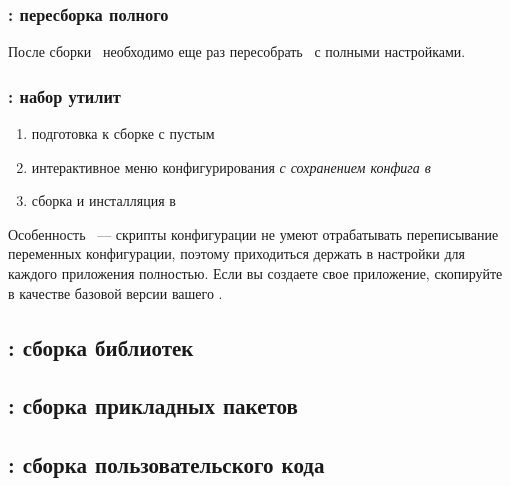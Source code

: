 


\subsubsection{: пересборка полного } \label{azgcc}

После сборки \ необходимо еще раз пересобрать \ с полными
настройками.

\subsubsection{: набор утилит } \label{azbb}


\begin{enumerate}
  \item подготовка к сборке с пустым 
  \item интерактивное меню конфигурирования \emph{с сохранением конфига в
  }
  \item сборка и инсталляция в 
\end{enumerate}

\bigskip
Особенность \ --- скрипты конфигурации не умеют отрабатывать
переписывание переменных конфигурации, поэтому приходиться держать в
 настройки для каждого приложения полностью. Если вы создаете
свое приложение, скопируйте  в качестве базовой версии вашего
.

\subsection{: сборка библиотек } \label{azlibs}

\subsection{: сборка прикладных пакетов }
\label{azapps}

\subsection{: сборка пользовательского кода} \label{azuser}

